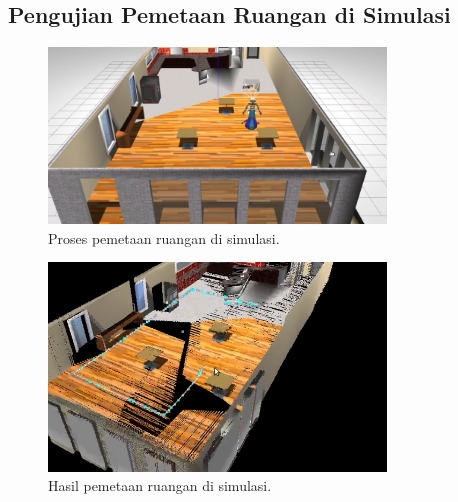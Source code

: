 \subsection{Pengujian Pemetaan Ruangan di Simulasi}
\label{subsec:slamsimulasi}

\begin{figure}[ht]
  \centering
  \includegraphics[width=0.8\textwidth,keepaspectratio]{gambar/proses-pemetaan.png}
  \caption{Proses pemetaan ruangan di simulasi.}
  \label{fig:prosespemetaan}
\end{figure}

\begin{figure}[ht]
  \centering
  \includegraphics[width=0.8\textwidth,keepaspectratio]{gambar/hasil-pemetaan.png}
  \caption{Hasil pemetaan ruangan di simulasi.}
  \label{fig:hasilpemetaan}
\end{figure}

